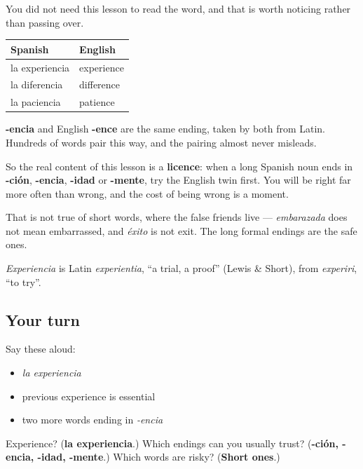 \begin{cousinweb}
You did not need this lesson to read the word, and that is worth noticing rather than passing over.

\noindent
\begin{tabularx}{\linewidth}{@{}>{\raggedright\arraybackslash}X>{\raggedright\arraybackslash}X@{}}
\toprule
\textbf{Spanish} & \textbf{English} \\
\midrule
la experiencia & experience \\
la diferencia & difference \\
la paciencia & patience \\
\bottomrule
\end{tabularx}

\textbf{-encia} and English \textbf{-ence} are the same ending, taken by both from Latin. Hundreds of words pair this way, and the pairing almost never misleads.

So the real content of this lesson is a \textbf{licence}: when a long Spanish noun ends in \textbf{-ción}, \textbf{-encia}, \textbf{-idad} or \textbf{-mente}, try the English twin first. You will be right far more often than wrong, and the cost of being wrong is a moment.

That is not true of short words, where the false friends live — \emph{embarazada} does not mean embarrassed, and \emph{éxito} is not exit. The long formal endings are the safe ones.

\emph{Experiencia} is Latin \emph{experientia}, \textquotedblleft{}a trial, a proof\textquotedblright{} (Lewis \& Short), from \emph{experiri}, \textquotedblleft{}to try\textquotedblright{}.
\end{cousinweb}

\subsection*{Your turn}
Say these aloud:

\begin{itemize}
\raggedright
  \item \emph{la experiencia}
  \item previous experience is essential
  \item two more words ending in \emph{-encia}
\end{itemize}

\begin{tcolorbox}[breakable,colback=teal!4,colframe=teal!35!black,title={Before you move on}]
Experience? (\textbf{la experiencia}.) Which endings can you usually trust? (\textbf{-ción, -encia, -idad, -mente}.) Which words are risky? (\textbf{Short ones}.)
\end{tcolorbox}
